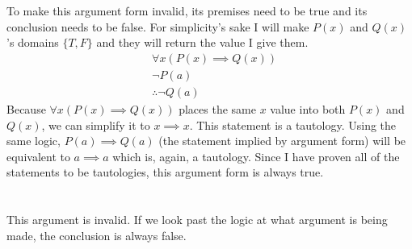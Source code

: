\documentclass[draft]{article}
\begin{document}
\section{}
To make this argument form invalid, its premises need to be true and its
conclusion needs to be false. For simplicity's sake I will make $P(x)$ and
$Q(x)$'s domains $\{T,F\}$ and they will return the value I give them.
\begin{align*}
     & \forall x( P(x) \implies Q(x)) \\
     & \neg P(a)                       \\
     & \therefore \neg Q(a)
\end{align*}
Because $\forall x( P(x) \implies Q(x))$ places the same $x$ value into both $P(x)$ and $Q(x)$, we can simplify it to $x \implies x$. This statement is a tautology. Using the same logic, $P(a) \implies Q(a)$ (the statement implied by argument form) will be equivalent to $a \implies a$ which is, again, a tautology. Since I have proven all of the statements to be tautologies, this argument form is always true.

\section{}

\section{}
This argument is invalid. If we look past the logic at what argument is being made,
the conclusion is always false.
\end{document}
